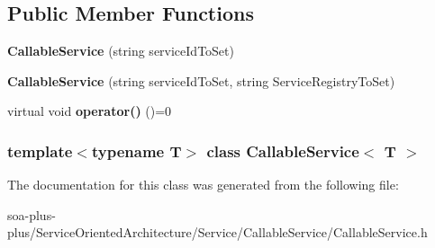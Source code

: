 \subsection*{Public Member Functions}
\begin{DoxyCompactItemize}
\item 
\hypertarget{class_callable_service_a9f8654275cbffea8907ccbd91f63fab1}{
{\bfseries CallableService} (string serviceIdToSet)}
\label{class_callable_service_a9f8654275cbffea8907ccbd91f63fab1}

\item 
\hypertarget{class_callable_service_a74029389a5c762dfdd2e87929a6bd622}{
{\bfseries CallableService} (string serviceIdToSet, string ServiceRegistryToSet)}
\label{class_callable_service_a74029389a5c762dfdd2e87929a6bd622}

\item 
\hypertarget{class_callable_service_aadc4c5fa6bf91b211289e2a3a499c354}{
virtual void {\bfseries operator()} ()=0}
\label{class_callable_service_aadc4c5fa6bf91b211289e2a3a499c354}

\end{DoxyCompactItemize}
\subsubsection*{template$<$typename T$>$ class CallableService$<$ T $>$}



The documentation for this class was generated from the following file:\begin{DoxyCompactItemize}
\item 
soa-\/plus-\/plus/ServiceOrientedArchitecture/Service/CallableService/CallableService.h\end{DoxyCompactItemize}
